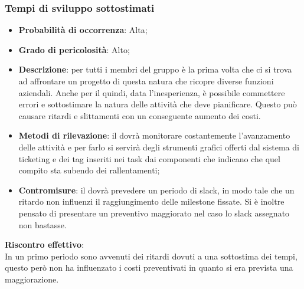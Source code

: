 		\subsubsection{Tempi di sviluppo sottostimati} %
		\label{ssub:tempi_di_sviluppo_sottostimati}
			\begin{itemize}
				\item \textbf{Probabilità di occorrenza}: Alta;
				\item \textbf{Grado di pericolosità}: Alto;
				\item \textbf{Descrizione}: per tutti i membri del gruppo è la prima volta che ci si trova ad affrontare un progetto di questa natura che ricopre diverse funzioni aziendali. Anche per il \roleProjectManager{} quindi, data l'inesperienza, è possibile commettere errori e sottostimare la natura delle attività che deve pianificare. Questo può causare ritardi e slittamenti con un conseguente aumento dei costi.
				\item \textbf{Metodi di rilevazione}: il \roleProjectManager{} dovrà monitorare costantemente l'avanzamento delle attività e per farlo si servirà degli strumenti grafici offerti dal sistema di ticketing\gloss{} e dei tag inseriti nei task\gloss{} dai componenti che indicano che quel compito sta subendo dei rallentamenti;
				\item \textbf{Contromisure}: il \roleProjectManager{} dovrà prevedere un periodo di slack, in modo tale che un ritardo non influenzi il raggiungimento delle milestone\gloss{} fissate. Si è inoltre pensato di presentare un preventivo maggiorato nel caso lo slack assegnato non bastasse.
			\end{itemize}
		\noindent
		\textbf{Riscontro effettivo}: \\
		In un primo periodo sono avvenuti dei ritardi dovuti a una sottostima dei tempi, questo però non ha influenzato i costi preventivati in quanto si era prevista una maggiorazione. 
		
